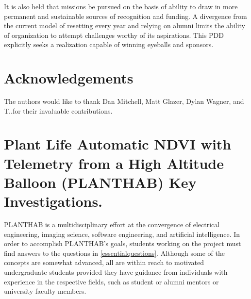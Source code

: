 \documentclass[conference]{IEEEtran} %
\begin{document}
It is also held that missions be pursued on the basis of ability to draw in more permanent and sustainable sources of recognition and funding. 
A divergence from the current model of resetting every year and relying on alumni limits the ability of organization to attempt challenges worthy of its aspirations. 
This PDD explicitly seeks a realization capable of winning eyeballs and sponsors.

\section*{Acknowledgements}
The authors would like to thank Dan Mitchell, Matt Glazer, Dylan Wagner, and T.\@J.\@Tarazevits for their invaluable contributions. 




\onecolumn
\appendices{}


\section{Plant Life Automatic NDVI with Telemetry from a High Altitude Balloon (PLANTHAB) Key Investigations.}
PLANTHAB is a multidisciplinary effort at the convergence of electrical engineering, imaging science, software engineering, and artificial intelligence. 
In order to accomplish PLANTHAB's goals, students working on the project must find answers to the questions in \autoref{essentialquestions}.
Although some of the concepts are somewhat advanced, all are within reach to motivated undergraduate students provided they have guidance from individuals with experience in the respective fields, such as student or alumni mentors or university faculty members.
\end{document}
